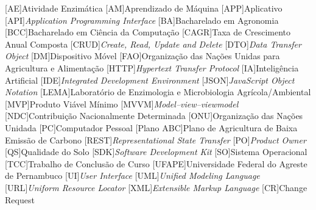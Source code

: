 \begin{acronym}[ACRONYM] 
[AE]{Atividade Enzimática}
[AM]{Aprendizado de Máquina}
[APP]{Aplicativo}
[API]{\textit{Application Programming Interface}}
[BA]{Bacharelado em Agronomia}
[BCC]{Bacharelado em Ciência da Computação}
[CAGR]{Taxa de Crescimento Anual Composta}
[CRUD]{\textit{Create, Read, Update and Delete}}
[DTO]{\textit{Data Transfer Object}}
[DM]{Dispositivo Móvel}
[FAO]{Organização das Nações Unidas para Agricultura e Alimentação}
[HTTP]{\textit{Hypertext Transfer Protocol}}
[IA]{Inteligência Artificial}
[IDE]{\textit{Integrated Development Environment}}
[JSON]{\textit{JavaScript Object Notation}}
[LEMA]{Laboratório de Enzimologia e Microbiologia Agrícola/Ambiental}
[MVP]{Produto Viável Mínimo}
[MVVM]{\textit{Model–view–viewmodel}}
[NDC]{Contribuição Nacionalmente Determinada}
[ONU]{Organização das Nações Unidada}
[PC]{Computador Pessoal}
[Plano ABC]{Plano de Agricultura de Baixa Emissão de Carbono}
[REST]{\textit{Representational State Transfer}}
[PO]{\textit{Product Owner}}
[QS]{Qualidade do Solo}
[SDK]{\textit{Software Development Kit}}
[SO]{Sistema Operacional}
[TCC]{Trabalho de Conclusão de Curso}
[UFAPE]{Universidade Federal do Agreste de Pernambuco}
[UI]{\textit{User Interface}}
[UML]{\textit{Unified Modeling Language}}
[URL]{\textit{Uniform Resource Locator}}
[XML]{\textit{Extensible Markup Language}}
[CR]{Change Request}

\end{acronym}
